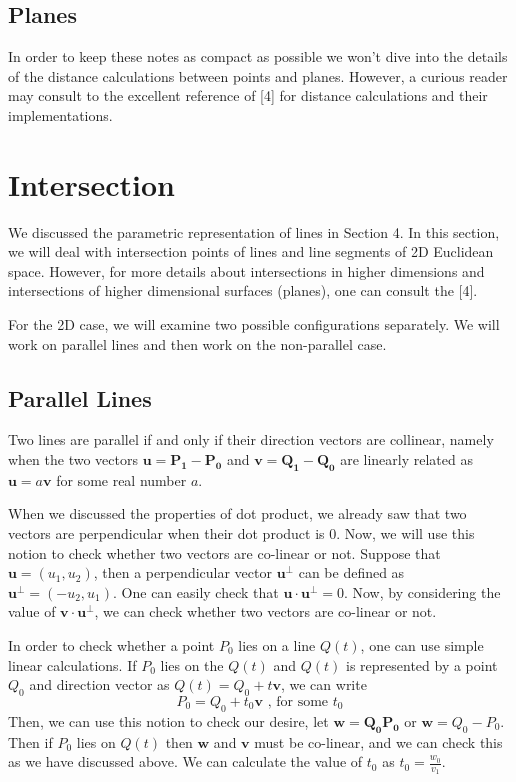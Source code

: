 \documentclass[12pt]{article}
\begin{document}
\subsection{Planes}
In order to keep these notes as compact as possible we won't dive into the details
of the distance calculations between points and planes. However, a curious reader may consult to the excellent reference of [4] for distance calculations and 
their implementations.

\section{Intersection}
We discussed the parametric representation of lines in Section 4. 
In this section, we will deal with intersection points of lines and
line segments of 2D Euclidean space. However, for more details
about intersections in higher dimensions and intersections of 
higher dimensional surfaces (planes), one can consult the [4].

For the 2D case, we will examine two possible configurations separately.
We will work on parallel lines and then work on the non-parallel case.

\subsection{Parallel Lines}
Two lines are parallel if and only if their direction vectors are 
collinear, namely when the two vectors $\pmb{u}=\pmb{P_1-P_0}$ 
and $\pmb{v}=\pmb{Q_1-Q_0}$ are linearly related as 
$\pmb{u} = a\pmb{v}$ for some real number $a$.

When we discussed the properties of dot product, we already saw that
two vectors are perpendicular when their dot product is $0$. Now,
we will use this notion to check whether two vectors are co-linear
or not. Suppose that $\pmb{u} = (u_1, u_2)$, then a perpendicular 
vector $\pmb{u}^\perp$ can be defined as $\pmb{u}^\perp = (-u_2, u_1)$.
One can easily check that $\pmb{u} \cdot \pmb{u}^\perp = 0$.
Now, by considering the value of $\pmb{v} \cdot \pmb{u}^\perp$,
we can check whether two vectors are co-linear or not.

In order to check whether a point $P_0$ lies on a line $Q(t)$,
one can use simple linear calculations. If $P_0$ lies on the $Q(t)$
and $Q(t)$ is represented by a point $Q_0$ and direction vector
 as $Q(t) = Q_0 + t\pmb{v}$, we can write
$$ P_0 = Q_0 + t_0 \pmb{v} \text{ , for some } t_0$$
Then, we can use this notion to check our desire, let 
$\pmb{w}=\pmb{Q_0P_0}$ or $\pmb{w} = Q_0 - P_0$. Then if $P_0$
lies on $Q(t)$ then $\pmb{w}$ and $\pmb{v}$ must be co-linear, and
we can check this as we have discussed above. We can calculate 
the value of $t_0$ as $t_0 = \frac{w_0}{v_1}$.
\end{document}
